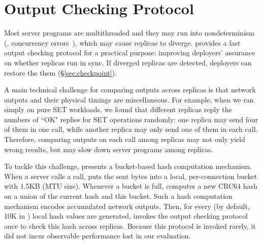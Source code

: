 \section{Output Checking Protocol} \label{sec:output}

Most server programs are multithreaded and they may run into nondeterminism 
(\eg, concurrency errors~\cite{lu:concurrency-bugs}), which may cause replicas 
to diverge. \xxx provides a fast output checking protocol for a practical 
purpose: improving \xxx deployers' assurance on whether replicas run in sync. If 
diverged replicas are detected, deployers can restore the 
them (\S\ref{sec:checkpoint}).

% 

A main technical challenge for comparing outputs across replicas is that 
network outputs and their physical timings are miscellaneous. For example, when 
we ran \redis simply on pure SET workloads, we found that different replicas 
reply the numbers of ``OK" replies for SET operations randomly: one replica may 
send four of them in one \send call, while another replica may only send one of 
them in each \send call. Therefore, comparing outputs on each \send call among 
replicas may not only yield wrong results, but may slow down server programs 
among replicas.

To tackle this challenge, \xxx presents a bucket-based hash computation 
mechanism. When a server calls a \send call, \xxx puts the sent bytes into a 
local, per-connection bucket with 1.5KB (MTU size). Whenever a bucket 
is full, \xxx computes a new CRC64 hash on a union of the current hash and this 
bucket. Such a hash computation mechanism encodes accumulated network outputs. 
Then, for every \thashcomp (by default, 10K in \xxx) local hash values 
are generated, \xxx invokes the output checking protocol once to check this 
hash across replicas. Because this protocol is invoked rarely, it did not incur 
observable performance lost in our evaluation.

